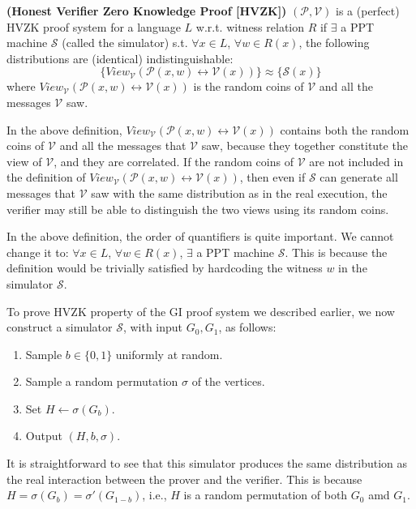 		\begin{definition} {\normalfont\textbf{(Honest Verifier Zero Knowledge Proof [HVZK])}} 
			$(\mathcal{P},\mathcal{V})$ is a (perfect) HVZK proof system for a language $L$ w.r.t. witness relation $R$ if 
			$\exists$ a PPT machine $\mathcal{S}$ (called the simulator) s.t. $\forall x \in L$, $\forall w\in R(x)$, the following distributions are (identical) indistinguishable:
		$$\{View_{\mathcal{V}}(\mathcal{P}(x,w) \leftrightarrow \mathcal{V}(x))\} \approx \{\mathcal{S}(x)\}$$
		where $View_{\mathcal{V}}(\mathcal{P}(x,w) \leftrightarrow \mathcal{V}(x))$ is the random coins of $\mathcal{V}$ and all the messages $\mathcal{V}$ saw.
  \end{definition}

\begin{remark}
In the above definition, $View_{\mathcal{V}}(\mathcal{P}(x,w) \leftrightarrow \mathcal{V}(x))$ contains both the random coins of $\mathcal{V}$ and all the messages that $\mathcal{V}$ saw, because they together constitute the view of $\mathcal{V}$, and they are correlated. If the random coins of $\mathcal{V}$ are not included in the definition of $View_{\mathcal{V}}(\mathcal{P}(x,w) \leftrightarrow \mathcal{V}(x))$, then even if $\mathcal{S}$ can generate all messages that $\mathcal{V}$ saw with the same distribution as in the real execution, the verifier may still be able to distinguish the two views using its random coins.
\end{remark}

\begin{remark}
In the above definition, the order of quantifiers is quite important. We cannot change it to: $\forall x \in L$, $\forall w\in R(x)$, $\exists$ a PPT machine $\mathcal{S}$. This is because the definition would be trivially satisfied by hardcoding the witness $w$ in the simulator $\mathcal{S}$.
\end{remark}

To prove HVZK property of the GI proof system we described earlier, we now construct a simulator $\mathcal{S}$, with input $G_0, G_1$, as follows:
\begin{enumerate}
	\item Sample $b\in\{0,1\}$ uniformly at random.
	\item Sample a random permutation $\sigma$ of the vertices.
	\item Set $H \gets \sigma(G_b)$.
	\item Output $(H, b, \sigma)$.
\end{enumerate}
It is straightforward to see that this simulator produces the same distribution as the real interaction between the prover and the verifier. This is because $H = \sigma(G_b) = \sigma'(G_{1-b})$, i.e., $H$ is a random permutation of both $G_0$ amd $G_1$. 
	
